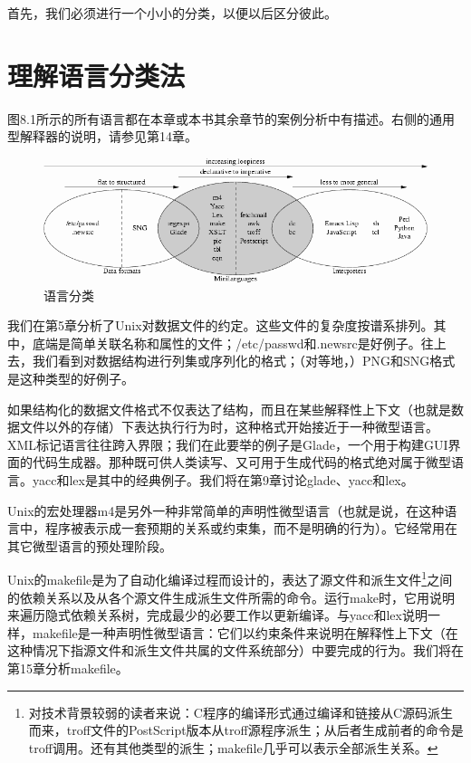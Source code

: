\documentclass[12pt,oneside]{book}
\begin{document}
首先，我们必须进行一个小小的分类，以便以后区分彼此。

\section{理解语言分类法}
图8.1所示的所有语言都在本章或本书其余章节的案例分析中有描述。右侧的通用型解释器的说明，请参见第14章。

\begin{figure}[H]
\centering
\includegraphics[width=\linewidth ,totalheight=0.95\textheight , keepaspectratio]{taxonomy.png}
\caption{语言分类}
\end{figure}


我们在第5章分析了Unix对数据文件的约定。这些文件的复杂度按谱系排列。其中，底端是简单关联名称和属性的文件；/etc/passwd和.newsrc是好例子。往上去，我们看到对数据结构进行列集或序列化的格式；（对等地，）PNG和SNG格式是这种类型的好例子。

如果结构化的数据文件格式不仅表达了结构，而且在某些解释性上下文（也就是数据文件以外的存储）下表达执行行为时，这种格式开始接近于一种微型语言。XML标记语言往往跨入界限；我们在此要举的例子是Glade，一个用于构建GUI界面的代码生成器。那种既可供人类读写、又可用于生成代码的格式绝对属于微型语言。yacc和lex是其中的经典例子。我们将在第9章讨论glade、yacc和lex。

Unix的宏处理器m4是另外一种非常简单的声明性微型语言（也就是说，在这种语言中，程序被表示成一套预期的关系或约束集，而不是明确的行为）。它经常用在其它微型语言的预处理阶段。

Unix的makefile是为了自动化编译过程而设计的，表达了源文件和派生文件\footnote{对技术背景较弱的读者来说：C程序的编译形式通过编译和链接从C源码派生而来，troff文件的PostScript版本从troff源程序派生；从后者生成前者的命令是troff调用。还有其他类型的派生；makefile几乎可以表示全部派生关系。}之间的依赖关系以及从各个源文件生成派生文件所需的命令。运行make时，它用说明来遍历隐式依赖关系树，完成最少的必要工作以更新编译。与yacc和lex说明一样，makefile是一种声明性微型语言：它们以约束条件来说明在解释性上下文（在这种情况下指源文件和派生文件共属的文件系统部分）中要完成的行为。我们将在第15章分析makefile。
\end{document}
